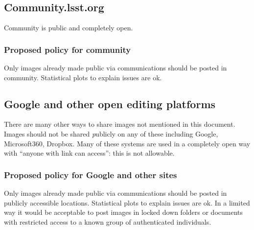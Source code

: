 \subsection{ Community.lsst.org}
Community is public and completely open.
\subsubsection{Proposed policy for community}
Only images already made public via communications should be posted in community.
Statistical plots to explain issues are ok.

\subsection{ Google and other open editing platforms}
There are many other ways to share images not mentioned in this document.
Images should not be shared {\emph publicly} on any of these including Google, Microsoft360, Dropbox.
Many of these systems are used in a completely open way with ``anyone with link can access'': this is not allowable.

\subsubsection{Proposed policy for Google and other sites}
Only images already made public via communications should be posted in publicly accessible locations.
Statistical plots to explain issues are ok.
In a limited way it would be acceptable to post images in locked down folders or documents with restricted access to a known group of authenticated individuals.

